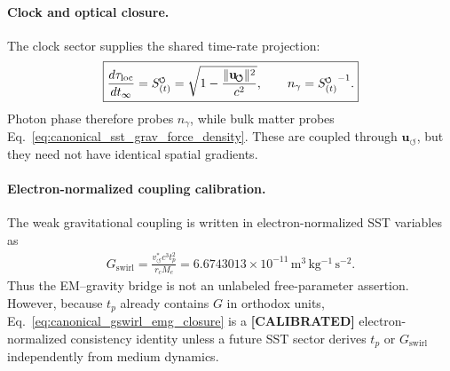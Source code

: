 \documentclass[11pt]{article}
\theoremstyle{definition}
\theoremstyle{plain}
\theoremstyle{remark}
\newcommand{\swirlarrow}{\mathchoice{\mkern-2mu\scriptstyle\boldsymbol{\circlearrowleft}}{\mkern-2mu\scriptstyle\boldsymbol{\circlearrowleft}}{\mkern-2mu\scriptscriptstyle\boldsymbol{\circlearrowleft}}{\mkern-2mu\scriptscriptstyle\boldsymbol{\circlearrowleft}}}
\newcommand{\SwirlClock}{{S_{(t)}^{\swirlarrow}}}
\newcommand{\rc}{{r_c}}
\newcommand{\vchar}{v_{\!\boldsymbol{\circlearrowleft}}^{\ast}}
\newcommand{\uswirl}{\mathbf{u}_{\!\boldsymbol{\circlearrowleft}}}
\begin{document}
        \paragraph{Clock and optical closure.}
        The clock sector supplies the shared time-rate projection:
        \begin{align}
            \boxed{
            \frac{d\tau_{\rm loc}}{dt_\infty}
            =
            \SwirlClock
            =
            \sqrt{1-\frac{\lVert\uswirl\rVert^2}{c^2}},
            \qquad
            n_\gamma=\SwirlClock^{-1}.
            }
            \label{eq:canonical_emg_clock_optical_closure}
        \end{align}
        Photon phase therefore probes \(n_\gamma\), while bulk matter probes Eq.~\eqref{eq:canonical_sst_grav_force_density}. These are coupled through \(\uswirl\), but they need not have identical spatial gradients.

        \paragraph{Electron-normalized coupling calibration.}
        The weak gravitational coupling is written in electron-normalized SST variables as
        \begin{align}
            \boxed{
            G_{\mathrm{swirl}}
            =
            \frac{\vchar c^3 t_p^2}{\rc M_e}
            =
            6.6743013\times10^{-11}\,\mathrm{m^3\,kg^{-1}\,s^{-2}}.
            }
            \label{eq:canonical_gswirl_emg_closure}
        \end{align}
        Thus the EM--gravity bridge is not an unlabeled free-parameter assertion. However, because \(t_p\) already contains \(G\) in orthodox units, Eq.~\eqref{eq:canonical_gswirl_emg_closure} is a \textbf{[CALIBRATED]} electron-normalized consistency identity unless a future SST sector derives \(t_p\) or \(G_{\mathrm{swirl}}\) independently from medium dynamics.
\end{document}
